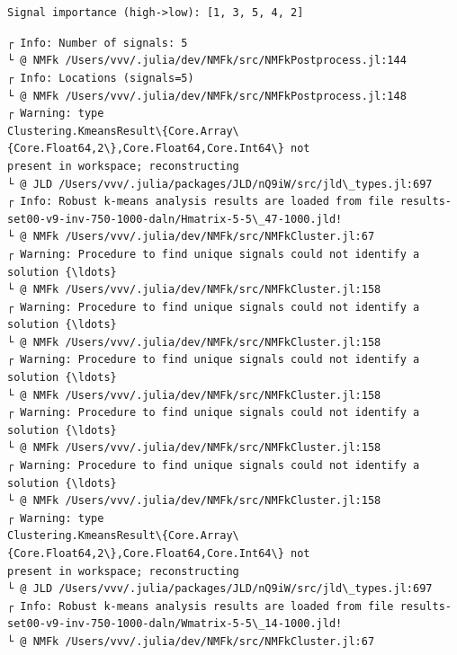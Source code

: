 \documentclass[11pt]{article}
\begin{document}
    \begin{center}
    \end{center}
    { \hspace*{\fill} \\}
    
    \begin{Verbatim}[commandchars=\\\{\}]

    \end{Verbatim}

    \begin{center}
    \end{center}
    { \hspace*{\fill} \\}
    
    \begin{Verbatim}[commandchars=\\\{\}]
Signal importance (high->low): [1, 3, 5, 4, 2]
    \end{Verbatim}

    \begin{Verbatim}[commandchars=\\\{\}]
┌ Info: Number of signals: 5
└ @ NMFk /Users/vvv/.julia/dev/NMFk/src/NMFkPostprocess.jl:144
┌ Info: Locations (signals=5)
└ @ NMFk /Users/vvv/.julia/dev/NMFk/src/NMFkPostprocess.jl:148
┌ Warning: type
Clustering.KmeansResult\{Core.Array\{Core.Float64,2\},Core.Float64,Core.Int64\} not
present in workspace; reconstructing
└ @ JLD /Users/vvv/.julia/packages/JLD/nQ9iW/src/jld\_types.jl:697
┌ Info: Robust k-means analysis results are loaded from file results-
set00-v9-inv-750-1000-daln/Hmatrix-5-5\_47-1000.jld!
└ @ NMFk /Users/vvv/.julia/dev/NMFk/src/NMFkCluster.jl:67
┌ Warning: Procedure to find unique signals could not identify a solution {\ldots}
└ @ NMFk /Users/vvv/.julia/dev/NMFk/src/NMFkCluster.jl:158
┌ Warning: Procedure to find unique signals could not identify a solution {\ldots}
└ @ NMFk /Users/vvv/.julia/dev/NMFk/src/NMFkCluster.jl:158
┌ Warning: Procedure to find unique signals could not identify a solution {\ldots}
└ @ NMFk /Users/vvv/.julia/dev/NMFk/src/NMFkCluster.jl:158
┌ Warning: Procedure to find unique signals could not identify a solution {\ldots}
└ @ NMFk /Users/vvv/.julia/dev/NMFk/src/NMFkCluster.jl:158
┌ Warning: Procedure to find unique signals could not identify a solution {\ldots}
└ @ NMFk /Users/vvv/.julia/dev/NMFk/src/NMFkCluster.jl:158
┌ Warning: type
Clustering.KmeansResult\{Core.Array\{Core.Float64,2\},Core.Float64,Core.Int64\} not
present in workspace; reconstructing
└ @ JLD /Users/vvv/.julia/packages/JLD/nQ9iW/src/jld\_types.jl:697
┌ Info: Robust k-means analysis results are loaded from file results-
set00-v9-inv-750-1000-daln/Wmatrix-5-5\_14-1000.jld!
└ @ NMFk /Users/vvv/.julia/dev/NMFk/src/NMFkCluster.jl:67
    \end{Verbatim}
\end{document}
